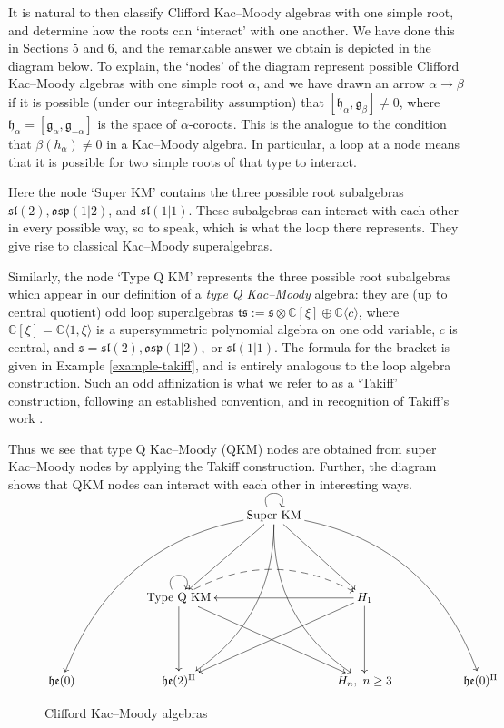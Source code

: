\documentclass[12pt, a4paper, reqno]{amsart}
\def\C{\mathbb{C}}
\def\e{\mathfrak{e}}
\def\p{\mathfrak{p}}
\def\g{\mathfrak{g}}
\def\h{\mathfrak{h}}
\def\l{\mathfrak{l}}
\def\s{\mathfrak{s}}
\def\o{\mathfrak{o}}
\theoremstyle{definition}
\theoremstyle{definition}
\theoremstyle{definition}
\numberwithin{theorem}{section}
\numberwithin{lemma}{section}
\numberwithin{remark}{section}
\numberwithin{definition}{section}
\numberwithin{corollary}{section}
\numberwithin{proposition}{section}
\numberwithin{example}{section}
\begin{document}
	It is natural to then classify Clifford Kac--Moody algebras with one simple root, and determine how the roots can `interact' with one another.  We have done this in Sections 5 and 6, and the remarkable answer we obtain is depicted in the diagram below.  To explain, the `nodes' of the diagram represent possible Clifford Kac--Moody algebras with one simple root $\alpha$, and we have drawn an arrow $\alpha\to\beta$ if it is possible (under our integrability assumption) that $[\h_{\alpha},\g_{\beta}]\neq0$, where $\h_{\alpha}=[\g_{\alpha},\g_{-\alpha}]$ is the space of $\alpha$-coroots.  This is the analogue to the condition that $\beta(h_\alpha)\neq0$ in a Kac--Moody algebra.  In particular, a loop at a node means that it is possible for two simple roots of that type to interact.
	
	Here the node `Super KM' contains the three possible root subalgebras $\s\l(2),\o\s\p(1|2)$, and $\s\l(1|1)$.  These subalgebras can interact with each other in every possible way, so to speak, which is what the loop there represents.  They give rise to classical Kac--Moody superalgebras.
	
	Similarly, the node `Type Q KM' represents the three possible root subalgebras which appear in our definition of a \emph{type Q Kac--Moody} algebra: they are (up to central quotient) odd loop superalgebras $\mathfrak{t}\s:=\s\otimes\C[\xi]\oplus\C\langle c\rangle$, where $\C[\xi]=\C\langle1,\xi\rangle$ is a supersymmetric polynomial algebra on one odd variable, $c$ is central, and $\s=\s\l(2),\o\s\p(1|2),$ or $\s\l(1|1)$.  The formula for the bracket is given in Example \ref{example-takiff}, and is entirely analogous to the loop algebra construction.  Such an odd affinization is what we refer to as a `Takiff' construction, following an established convention, and in recognition of Takiff's work \cite{T}.
	
	Thus we see that type Q Kac--Moody (QKM) nodes are obtained from super Kac--Moody nodes by applying the Takiff construction.  Further, the diagram shows that QKM nodes can interact with each other in interesting ways.
	
	
	\begin{figure}[h] 
	\[
	\xymatrix{
		&&&\text{Super KM}  \ar@(ul,ur) \ar@/_3pc/[ddddlll] \ar@/^3pc/[ddddrrr]\ar[ddr]\ar[ddl] \ar@/^2pc/[ddddl]\ar@/_2pc/[ddddr]&&&\\
		&&&&&&\\
		&&\text{Type Q KM}\ar[dd] \ar[ddrr] \ar@(ul,ur)\ar@/^2pc/@{-->}[rr] &&\ar[ll] \ar[dd]\ar[lldd]H_1 &&\\
		&&&&&&\\
		\h\e(0) & & \h\e(2)^{\Pi} && H_n,\ n\geq 3 & & \h\e(0)^{\Pi}
	}
	\]
	\caption{Clifford Kac--Moody algebras}\label{Fig1a}
\end{figure}
\end{document}
